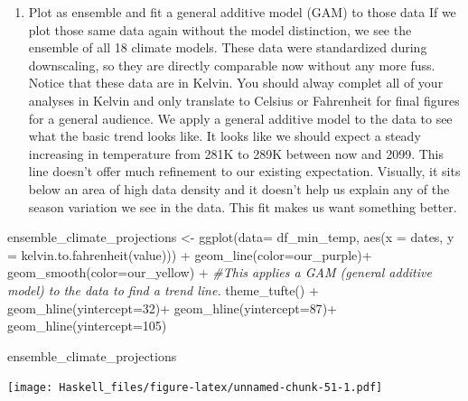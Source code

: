 \documentclass[
  paper=a4,
  ,captions=tableheading
]{scrartcl}
\newenvironment{Shaded}{\begin{snugshade}}{\end{snugshade}}
\newcommand{\AttributeTok}[1]{\textcolor[rgb]{0.77,0.63,0.00}{#1}}
\newcommand{\CommentTok}[1]{\textcolor[rgb]{0.56,0.35,0.01}{\textit{#1}}}
\newcommand{\DecValTok}[1]{\textcolor[rgb]{0.00,0.00,0.81}{#1}}
\newcommand{\FunctionTok}[1]{\textcolor[rgb]{0.00,0.00,0.00}{#1}}
\newcommand{\NormalTok}[1]{#1}
\newcommand{\OtherTok}[1]{\textcolor[rgb]{0.56,0.35,0.01}{#1}}
\newcommand{\SpecialCharTok}[1]{\textcolor[rgb]{0.00,0.00,0.00}{#1}}
\providecommand{\tightlist}{%
  \setlength{\itemsep}{0pt}\setlength{\parskip}{0pt}}
\begin{document}
\begin{enumerate}
\def\labelenumi{\arabic{enumi}.}
\setcounter{enumi}{2}
\tightlist
\item
  Plot as ensemble and fit a general additive model (GAM) to those data
  If we plot those same data again without the model distinction, we see
  the ensemble of all 18 climate models. These data were standardized
  during downscaling, so they are directly comparable now without any
  more fuss. Notice that these data are in Kelvin. You should alway
  complet all of your analyses in Kelvin and only translate to Celsius
  or Fahrenheit for final figures for a general audience. We apply a
  general additive model to the data to see what the basic trend looks
  like. It looks like we should expect a steady increasing in
  temperature from 281K to 289K between now and 2099. This line doesn't
  offer much refinement to our existing expectation. Visually, it sits
  below an area of high data density and it doesn't help us explain any
  of the season variation we see in the data. This fit makes us want
  something better.
\end{enumerate}

\begin{Shaded}
\begin{Highlighting}[]
\NormalTok{ensemble\_climate\_projections }\OtherTok{\textless{}{-}} \FunctionTok{ggplot}\NormalTok{(}\AttributeTok{data=}\NormalTok{ df\_min\_temp, }\FunctionTok{aes}\NormalTok{(}\AttributeTok{x =}\NormalTok{ dates, }\AttributeTok{y =} \FunctionTok{kelvin.to.fahrenheit}\NormalTok{(value))) }\SpecialCharTok{+} 
  \FunctionTok{geom\_line}\NormalTok{(}\AttributeTok{color=}\NormalTok{our\_purple)}\SpecialCharTok{+}
  \FunctionTok{geom\_smooth}\NormalTok{(}\AttributeTok{color=}\NormalTok{our\_yellow) }\SpecialCharTok{+} \CommentTok{\#This applies a GAM (general additive model) to the data to find a trend line. }
  \FunctionTok{theme\_tufte}\NormalTok{() }\SpecialCharTok{+}
  \FunctionTok{geom\_hline}\NormalTok{(}\AttributeTok{yintercept=}\DecValTok{32}\NormalTok{)}\SpecialCharTok{+}
  \FunctionTok{geom\_hline}\NormalTok{(}\AttributeTok{yintercept=}\DecValTok{87}\NormalTok{)}\SpecialCharTok{+}
  \FunctionTok{geom\_hline}\NormalTok{(}\AttributeTok{yintercept=}\DecValTok{105}\NormalTok{)}

\NormalTok{ensemble\_climate\_projections}
\end{Highlighting}
\end{Shaded}

\texttt{[image: Haskell\_files/figure-latex/unnamed-chunk-51-1.pdf]}
\end{document}
